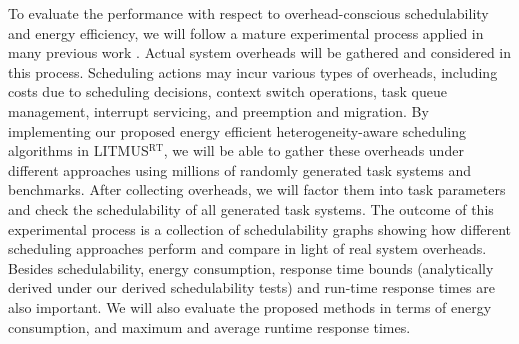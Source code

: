 To evaluate the performance with respect to overhead-conscious schedulability and energy efficiency, we will follow a mature experimental process applied in many previous work \cite{BBBdissertation, clustered, bastoni2010, calandrino2007, johndissertation}. Actual system overheads will be gathered and considered in this process. Scheduling actions may incur various types of overheads, including costs due to scheduling decisions, context switch operations, task queue management, interrupt servicing, and preemption and migration. By implementing our proposed energy efficient heterogeneity-aware scheduling algorithms in LITMUS$^{\textrm{RT}}$, we will be able to gather these overheads under different approaches using millions of randomly generated task systems and benchmarks.  After collecting overheads, we will factor them into task parameters and check the schedulability of all generated task systems. The outcome of this experimental process is a collection of schedulability graphs showing how different scheduling approaches perform and compare in light of real system overheads. Besides schedulability, energy consumption, response time bounds (analytically derived under our derived schedulability tests) and run-time response times are also important. We will also evaluate the proposed methods in terms of energy consumption, and maximum and average runtime response times.  